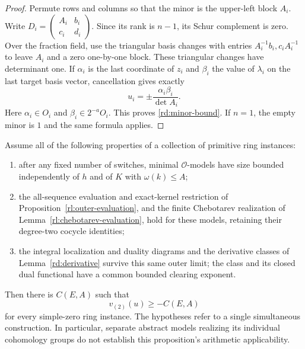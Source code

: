 \begin{proof}
Permute rows and columns so that the minor is the upper-left block
\(A_i\).  Write \(D_i=\left(\begin{smallmatrix}A_i&b_i\\c_i&d_i
\end{smallmatrix}\right)\).  Since its rank is \(n-1\), its Schur
complement is zero.  Over the fraction field, use the triangular
basis changes with entries \(A_i^{-1}b_i,c_iA_i^{-1}\) to leave
\(A_i\) and a zero one-by-one block.  These triangular changes
have determinant one.  If \(\alpha_i\) is the last coordinate
of \(z_i\) and \(\beta_i\) the value of \(\lambda_i\) on the last
target basis vector, cancellation gives exactly
\begin{equation}
 u_i=\pm\frac{\alpha_i\beta_i}{\det A_i}.
 \label{rd:minor-formula}
\end{equation}
Here \(\alpha_i\in O_i\) and \(\beta_i\in2^{-a}O_i\).
This proves \eqref{rd:minor-bound}.  If \(n=1\), the empty
minor is \(1\) and the same formula applies.
\end{proof}

\begin{proposition}
\label{rd:outer-bound}
Assume all of the following properties of a collection of primitive
ring instances:
\begin{enumerate}
\item after any fixed number of switches, minimal \(\mathcal O\)-models
have size bounded independently of \(h\) and of \(K\) with
\(\omega(k)\le A\);
\item the all-sequence evaluation and exact-kernel restriction of
Proposition~\ref{rl:outer-evaluation}, and the finite Chebotarev
realization of Lemma~\ref{rl:chebotarev-evaluation}, hold for these
models, retaining their degree-two cocycle identities;
\item the integral localization and duality diagrams and the
derivative classes of Lemma~\ref{rd:derivative} survive this same
outer limit; the class and its closed dual functional have a common
bounded clearing exponent.
\end{enumerate}
Then there is \(C(E,A)\) such that
\begin{equation}
 v_{(2)}(u)\ge-C(E,A)
 \label{rd:residual-bound}
\end{equation}
for every simple-zero ring instance.  The hypotheses refer to a
single simultaneous construction.  In particular, separate
abstract models realizing its individual cohomology groups do
not establish this proposition's arithmetic applicability.
\end{proposition}

